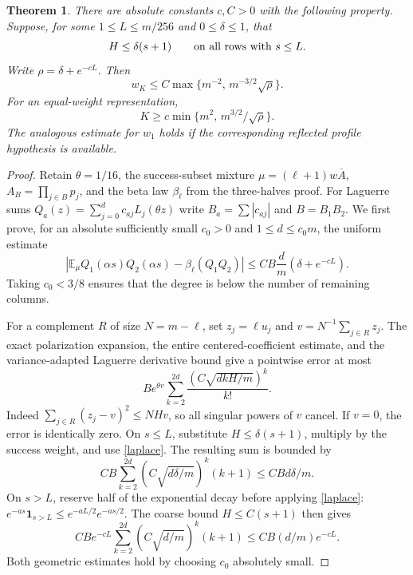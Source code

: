 \documentclass[11pt]{article}
\newtheorem{theorem}{Theorem}
\newcommand{\E}{\mathbb E}
\begin{document}
\begin{theorem}\label{main}
There are absolute constants $c,C>0$ with the following property.
Suppose, for some $1\le L\le m/256$ and $0\le\delta\le1$, that
\begin{equation}\label{extra}
 H\le\delta(s+1)\qquad\hbox{on all rows with }s\le L.
\end{equation}
Write $\rho=\delta+e^{-cL}$. Then
\[
 w_K\le C\max\{m^{-2},\,m^{-3/2}\sqrt\rho\}.
\]
For an equal-weight representation,
\[
 K\ge c\min\{m^2,\,m^{3/2}/\sqrt\rho\}.
\]
The analogous estimate for $w_1$ holds if the corresponding reflected
profile hypothesis is available.
\end{theorem}
\begin{proof}
Retain $\theta=1/16$, the success-subset mixture
$\mu=(\ell+1)w\overline A$, $A_B=\prod_{j\in B}p_j$, and the beta law
$\beta_\ell$ from the three-halves proof. For Laguerre sums
$Q_a(z)=\sum_{j=0}^d c_{aj}L_j(\theta z)$ write
$B_a=\sum|c_{aj}|$ and $B=B_1B_2$.
We first prove, for an absolute sufficiently small $c_0>0$ and
$1\le d\le c_0m$, the uniform estimate
\begin{equation}\label{comparison}
 |\E_\mu Q_1(\alpha s)Q_2(\alpha s)
       -\beta_\ell(Q_1Q_2)|
 \le CB\frac d m(\delta+e^{-cL}).
\end{equation}
Taking $c_0<3/8$ ensures that the degree is below the number of
remaining columns.

For a complement $R$ of size $N=m-\ell$, set $z_j=\ell u_j$ and
$v=N^{-1}\sum_{j\in R}z_j$. The exact polarization expansion,
the entire centered-coefficient estimate, and the variance-adapted
Laguerre derivative bound give a pointwise error at most
\[
 B e^{\theta v}\sum_{k=2}^{2d}
       \frac{(C\sqrt{dkH/m})^k}{k!}.
\]
Indeed $\sum_{j\in R}(z_j-v)^2\le NHv$, so all singular powers of
$v$ cancel. If $v=0$, the error is identically zero.
On $s\le L$, substitute $H\le\delta(s+1)$, multiply by the success
weight, and use \eqref{laplace}. The resulting sum is bounded by
\[
 CB\sum_{k=2}^{2d}(C\sqrt{d\delta/m})^k(k+1)
 \le CBd\delta/m.
\]
On $s>L$, reserve half of the exponential decay before applying
\eqref{laplace}: $e^{-as}\boldsymbol1_{s>L}
\le e^{-aL/2}e^{-as/2}$. The coarse bound $H\le C(s+1)$ then gives
\[
 CB e^{-cL}\sum_{k=2}^{2d}(C\sqrt{d/m})^k(k+1)
 \le CB(d/m)e^{-cL}.
\]
Both geometric estimates hold by choosing $c_0$ absolutely small.


\end{proof}
\end{document}
